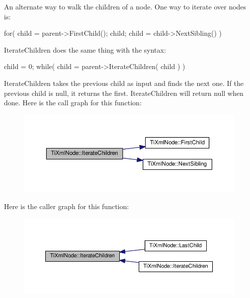 An alternate way to walk the children of a node. One way to iterate over nodes is\+: \begin{DoxyVerb}    for( child = parent->FirstChild(); child; child = child->NextSibling() )
\end{DoxyVerb}


Iterate\+Children does the same thing with the syntax\+: \begin{DoxyVerb}    child = 0;
    while( child = parent->IterateChildren( child ) )
\end{DoxyVerb}


Iterate\+Children takes the previous child as input and finds the next one. If the previous child is null, it returns the first. Iterate\+Children will return null when done. Here is the call graph for this function\+:
\nopagebreak
\begin{figure}[H]
\begin{center}
\leavevmode
\includegraphics[width=350pt]{class_ti_xml_node_a67c3a02b797f08d9a31b2553661257e1_cgraph}
\end{center}
\end{figure}
Here is the caller graph for this function\+:
\nopagebreak
\begin{figure}[H]
\begin{center}
\leavevmode
\includegraphics[width=350pt]{class_ti_xml_node_a67c3a02b797f08d9a31b2553661257e1_icgraph}
\end{center}
\end{figure}
\mbox{\label{class_ti_xml_node_a2358e747118fdbf0e467b1e4f7d03de1}} 
